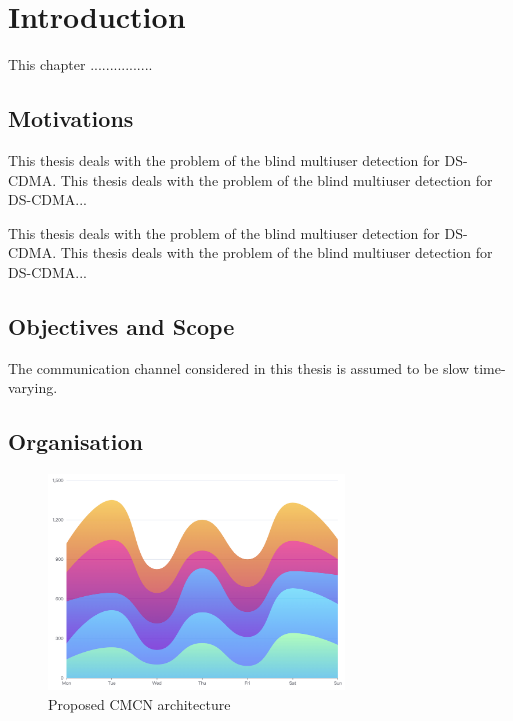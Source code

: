 \chapter{Introduction}
\begingroup
\raggedright
{}
\setlength{\parskip}{0.5\baselineskip}
\titlespacing{\chapter}{0pt}{0pt}{0pt}
\titlespacing{\section}{0pt}{0pt}{0pt}

This chapter ................

\section{Motivations}

This thesis deals with the problem of the blind multiuser detection for DS-CDMA. This thesis deals with the problem of the blind multiuser detection for DS-CDMA...

This thesis deals with the problem of the blind multiuser detection for DS-CDMA. This thesis deals with the problem of the blind multiuser detection for DS-CDMA...

\section{Objectives and Scope}

The communication channel considered in this thesis is assumed to be slow time-varying.

\section{Organisation}

\begin{figure}[h]
    \centering
    \includegraphics[width=0.7\textwidth]{assets/figures/demo.png}
    \caption{Proposed CMCN architecture}
    \label{fig:cmcn}
\end{figure}

\endgroup
